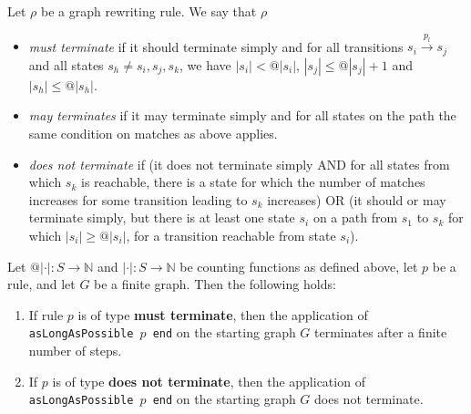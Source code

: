 \begin{definition}
    Let $\rho$ be a graph rewriting rule. We say that $\rho$
    \begin{itemize}
        \item \emph{must terminate} if it should terminate simply and for all transitions $s_i \xrightarrow{p_l} s_j$ and all states $s_h \neq s_i, s_j, s_k$, we have $\left| s_i \right| < @ | s_i |$, $\left| s_j \right| \leq @ | s_j | + 1$ and $\left| s_h \right| \leq @ | s_h |$.
        \item \emph{may terminates} if it may terminate simply and for all states on the path the same condition on matches as above applies.
        \item \emph{does not terminate} if (it does not terminate simply AND for all states from which $s_k$ is reachable, there is a state for which the number of matches increases for some transition leading to $s_k$ increases) OR (it should or may terminate simply, but there is at least one state $s_i$ on a path from $s_1$ to $s_k$ for which $\left| s_i \right| \geq @ | s_i |$, for a transition reachable from state $s_i$).
    \end{itemize}
\end{definition}

\begin{theorem}
    Let $@|\cdot|: S \to \mathbb{N}$ and $|\cdot|: S \to \mathbb{N}$ be counting functions as defined above, let $p$ be a rule, and let $G$ be a finite graph. Then the following holds:
    \begin{enumerate}
        \item If rule $p$ is of type \textbf{must terminate}, then the application of \texttt{asLongAsPossible $p$ end} on the starting graph $G$ terminates after a finite number of steps.
        
        \item If $p$ is of type \textbf{does not terminate}, then the application of \texttt{asLongAsPossible $p$ end} on the starting graph $G$ does not terminate.
    \end{enumerate}
\end{theorem}  